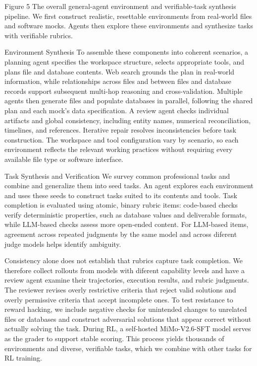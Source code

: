 \documentclass[
  10
]{article}
\begin{document}
Figure 5 The overall general-agent environment and verifiable-task
synthesis pipeline. We first construct realistic, resettable
environments from real-world files and software mocks. Agents then
explore these environments and synthesize tasks with verifiable rubrics.

Environment Synthesis To assemble these components into coherent
scenarios, a planning agent specifies the workspace structure, selects
appropriate tools, and plans file and database contents. Web search
grounds the plan in real-world information, while relationships across
files and between files and database records support subsequent
multi-hop reasoning and cross-validation. Multiple agents then generate
files and populate databases in parallel, following the shared plan and
each mock's data specification. A review agent checks individual
artifacts and global consistency, including entity names, numerical
reconciliation, timelines, and references. Iterative repair resolves
inconsistencies before task construction. The workspace and tool
configuration vary by scenario, so each environment reflects the
relevant working practices without requiring every available file type
or software interface.

Task Synthesis and Verification We survey common professional tasks and
combine and generalize them into seed tasks. An agent explores each
environment and uses these seeds to construct tasks suited to its
contents and tools. Task completion is evaluated using atomic, binary
rubric items: code-based checks verify deterministic properties, such as
database values and deliverable formats, while LLM-based checks assess
more open-ended content. For LLM-based items, agreement across repeated
judgments by the same model and across diferent judge models helps
identify ambiguity.

Consistency alone does not establish that rubrics capture task
completion. We therefore collect rollouts from models with diferent
capability levels and have a review agent examine their trajectories,
execution results, and rubric judgments. The reviewer revises overly
restrictive criteria that reject valid solutions and overly permissive
criteria that accept incomplete ones. To test resistance to reward
hacking, we include negative checks for unintended changes to unrelated
files or databases and construct adversarial solutions that appear
correct without actually solving the task. During RL, a self-hosted
MiMo-V2.6-SFT model serves as the grader to support stable scoring. This
process yields thousands of environments and diverse, verifiable tasks,
which we combine with other tasks for RL training.
\end{document}
